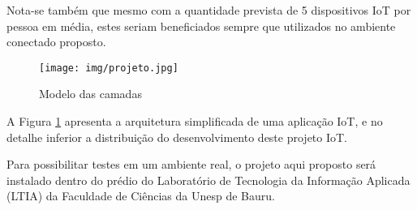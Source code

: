 Nota-se também que mesmo com a quantidade prevista de 5 dispositivos IoT por
pessoa em média, estes seriam beneficiados sempre que utilizados no ambiente
conectado proposto.

\begin{figure}[htb]
	\caption{\label{fig:projeto}Modelo das camadas }
	\begin{center}
		\texttt{[image: img/projeto.jpg]}
	\end{center}
\end{figure}

A Figura \ref{fig:projeto} apresenta a arquitetura simplificada de uma aplicação
IoT, e no detalhe inferior a distribuição do desenvolvimento deste projeto IoT.

Para possibilitar testes em um ambiente real, o projeto aqui proposto será
instalado dentro do prédio do Laboratório de Tecnologia da Informação Aplicada
(LTIA) da Faculdade de Ciências da Unesp de Bauru.
